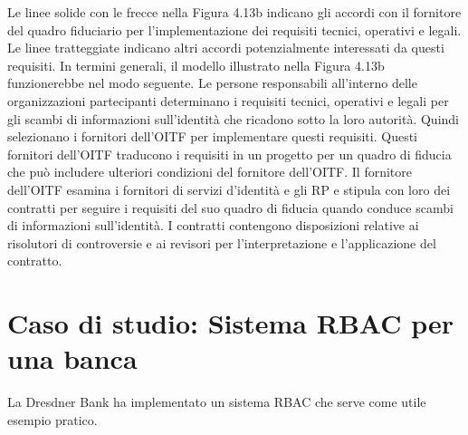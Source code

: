 \singlespacing

Le linee solide con le frecce nella Figura 4.13b indicano gli accordi con il fornitore del quadro fiduciario per l'implementazione dei requisiti tecnici, operativi e legali. Le linee tratteggiate indicano altri accordi potenzialmente interessati da questi requisiti. In termini generali, il modello illustrato nella Figura 4.13b funzionerebbe nel modo seguente. Le persone responsabili all'interno delle organizzazioni partecipanti determinano i requisiti tecnici, operativi e legali per gli scambi di informazioni sull'identità che ricadono sotto la loro autorità. Quindi selezionano i fornitori dell'OITF per implementare questi requisiti. Questi fornitori dell'OITF traducono i requisiti in un progetto per un quadro di fiducia che può includere ulteriori condizioni del fornitore dell'OITF. Il fornitore dell'OITF esamina i fornitori di servizi d'identità e gli RP e stipula con loro dei contratti per seguire i requisiti del suo quadro di fiducia quando conduce scambi di informazioni sull'identità. I contratti contengono disposizioni relative ai risolutori di controversie e ai revisori per l'interpretazione e l'applicazione del contratto.
\newpage
\section{Caso di studio: Sistema RBAC per una banca}
La Dresdner Bank ha implementato un sistema RBAC che serve come utile esempio pratico.
